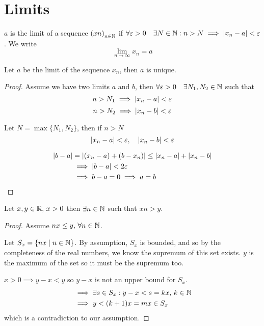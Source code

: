 \documentclass[a4paper,10pt]{article}
\begin{document}
\section{Limits}

\begin{defn}[Limit]
	$a$ is the limit of a sequence ${(xn)}_{n \in \mathbb{N}}$ if $\forall \varepsilon > 0 \quad \exists N \in \mathbb{N}: n > N \implies | x_n -a | < \varepsilon$.
	We write
	\[ \lim_{n \to \infty} x_n = a \]
\end{defn}

\begin{prop}
	Let $a$ be the limit of the sequence $x_n$, then $a$ is unique.
\end{prop}

\begin{proof}
	Assume we have two limits $a$ and $b$, then $\forall \varepsilon > 0
	\quad \exists N_1, N_2 \in \mathbb{N}$ such that
	\[ n > N_1 \implies |x_n - a| < \varepsilon \]
	\[ n > N_2 \implies |x_n - b| < \varepsilon \]

	Let $N = \max\{N_1, N_2\}$, then if $n > N$
	\[ |x_n - a| < \varepsilon, \quad |x_n - b| < \varepsilon \]

	\begin{align*}
		|b-a| &= |(x_n - a) + (b - x_n)| \leq |x_n - a| + |x_n - b| \\
		      &\implies |b-a| < 2\varepsilon \\
		      &\implies b - a = 0 \implies a = b
	\end{align*}
\end{proof}

\begin{thm}
	Let $x,y \in \mathbb{R}, \, x>0$ then $\exists n \in \mathbb{N}$ such that $xn > y$.
\end{thm}

\begin{proof}
	Assume $nx \leq y, \, \forall n \in \mathbb{N}$.

	Let $S_x = \{ nx \mid n \in \mathbb{N} \}$. By assumption, $S_x$ is
	bounded, and so by the completeness of the real numbers, we know
	the supremum of this set exists. $y$ is the maximum of the set
	so it must be the supremum too.

	 $x > 0 \implies y-x < y$ so $y-x$ is not an upper bound for $S_x$.
	 \begin{align*}
		 &\implies \exists s \in S_x : y-x < s = kx, \, k \in \mathbb{N} \\
		 &\implies y < (k+1)x = mx \in S_x
	 \end{align*}
	 which is a contradiction to our assumption.
 \end{proof}
\end{document}
